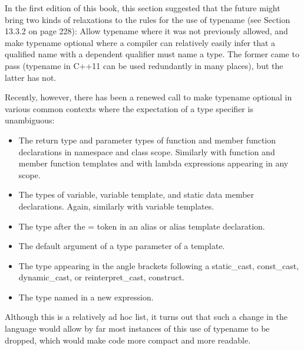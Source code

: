 
In the first edition of this book, this section suggested that the future might bring two kinds of relaxations to the rules for the use of typename (see Section 13.3.2 on page 228): Allow typename where it was not previously allowed, and make typename optional where a compiler can relatively easily infer that a qualified name with a dependent qualifier must name a type. The former came to pass (typename in C++11 can be used redundantly in many places), but the latter has not.

Recently, however, there has been a renewed call to make typename optional in various common contexts where the expectation of a type specifier is unambiguous:

\begin{itemize}
\item 
The return type and parameter types of function and member function declarations in namespace and class scope. Similarly with function and member function templates and with lambda expressions appearing in any scope.

\item 
The types of variable, variable template, and static data member declarations. Again, similarly with variable templates.

\item 
The type after the = token in an alias or alias template declaration.

\item 
The default argument of a type parameter of a template.

\item 
The type appearing in the angle brackets following a static\_cast, const\_cast, dynamic\_cast, or reinterpret\_cast, construct.

\item 
The type named in a new expression.
\end{itemize}

Although this is a relatively ad hoc list, it turns out that such a change in the language would allow by far most instances of this use of typename to be dropped, which would make code more compact and more readable.

